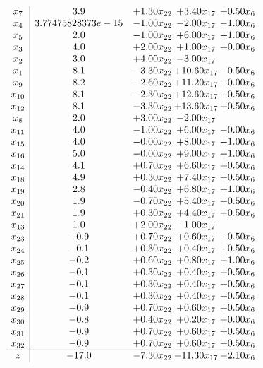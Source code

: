 \documentclass[8pt]{article}
\begin{document}
\[\begin{array}{c| c c@{\hskip 2pt} c@{\hskip 2pt} c@{\hskip 2pt} }
 x_{7}   &  3.9 & +  1.30 x_{22} & +  3.40 x_{17} & +  0.50 x_{6}\\
 x_{4}   &  3.77475828373e-15 & -1.00 x_{22} & -2.00 x_{17} & -1.00 x_{6}\\
 x_{5}   &  2.0 & -1.00 x_{22} & +  6.00 x_{17} & +  1.00 x_{6}\\
 x_{3}   &  4.0 & +  2.00 x_{22} & +  1.00 x_{17} & +  0.00 x_{6}\\
 x_{2}   &  3.0 & +  4.00 x_{22} & -3.00 x_{17} &   \\
 x_{1}   &  8.1 & -3.30 x_{22} & + 10.60 x_{17} & -0.50 x_{6}\\
 x_{9}   &  8.2 & -2.60 x_{22} & + 11.20 x_{17} & +  0.00 x_{6}\\
 x_{10}   &  8.1 & -2.30 x_{22} & + 12.60 x_{17} & +  0.50 x_{6}\\
 x_{12}   &  8.1 & -3.30 x_{22} & + 13.60 x_{17} & +  0.50 x_{6}\\
 x_{8}   &  2.0 & +  3.00 x_{22} & -2.00 x_{17} &   \\
 x_{11}   &  4.0 & -1.00 x_{22} & +  6.00 x_{17} & -0.00 x_{6}\\
 x_{15}   &  4.0 & -0.00 x_{22} & +  8.00 x_{17} & +  1.00 x_{6}\\
 x_{16}   &  5.0 & -0.00 x_{22} & +  9.00 x_{17} & +  1.00 x_{6}\\
 x_{14}   &  4.1 & +  0.70 x_{22} & +  6.60 x_{17} & +  0.50 x_{6}\\
 x_{18}   &  4.9 & +  0.30 x_{22} & +  7.40 x_{17} & +  0.50 x_{6}\\
 x_{19}   &  2.8 & -0.40 x_{22} & +  6.80 x_{17} & +  1.00 x_{6}\\
 x_{20}   &  1.9 & -0.70 x_{22} & +  5.40 x_{17} & +  0.50 x_{6}\\
 x_{21}   &  1.9 & +  0.30 x_{22} & +  4.40 x_{17} & +  0.50 x_{6}\\
 x_{13}   &  1.0 & +  2.00 x_{22} & -1.00 x_{17} &   \\
 x_{23}   &  -0.9 & +  0.70 x_{22} & +  0.60 x_{17} & +  0.50 x_{6}\\
 x_{24}   &  -0.1 & +  0.30 x_{22} & +  0.40 x_{17} & +  0.50 x_{6}\\
 x_{25}   &  -0.2 & +  0.60 x_{22} & +  0.80 x_{17} & +  1.00 x_{6}\\
 x_{26}   &  -0.1 & +  0.30 x_{22} & +  0.40 x_{17} & +  0.50 x_{6}\\
 x_{27}   &  -0.1 & +  0.30 x_{22} & +  0.40 x_{17} & +  0.50 x_{6}\\
 x_{28}   &  -0.1 & +  0.30 x_{22} & +  0.40 x_{17} & +  0.50 x_{6}\\
 x_{29}   &  -0.9 & +  0.70 x_{22} & +  0.60 x_{17} & +  0.50 x_{6}\\
 x_{30}   &  -0.8 & +  0.40 x_{22} & +  0.20 x_{17} & +  0.00 x_{6}\\
 x_{31}   &  -0.9 & +  0.70 x_{22} & +  0.60 x_{17} & +  0.50 x_{6}\\
 x_{32}   &  -0.9 & +  0.70 x_{22} & +  0.60 x_{17} & +  0.50 x_{6}\\
\hline
z    &  -17.0 & -7.30 x_{22} & -11.30 x_{17} & -2.10 x_{6}\\
\end{array}\]
\end{document}
